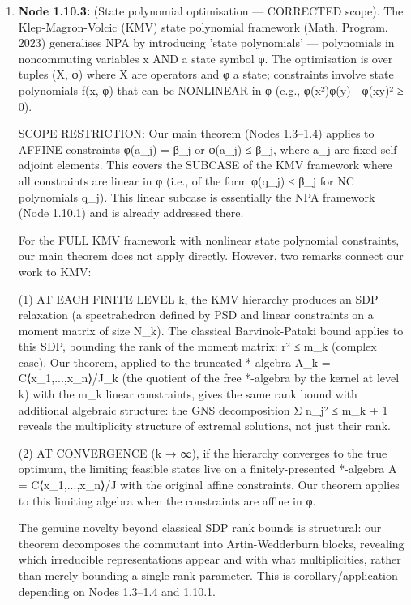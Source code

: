 \documentclass{article}
\begin{document}
\begin{enumerate}
\begin{enumerate}
This node is a corollary of the main theorem (Nodes 1.3-1.4) applied to the NPA setting (Node 1.10.1), not an assumption. It depends on Nodes 1, 1.3, 1.4, 1.6, and 1.10.1.

  Type: claim, Inference: assumption, Status: pending, Taint: unresolved

\item \textbf{Node 1.10.3:} (State polynomial optimisation — CORRECTED scope). The Klep-Magron-Volcic (KMV) state polynomial framework (Math. Program. 2023) generalises NPA by introducing 'state polynomials' — polynomials in noncommuting variables x AND a state symbol φ. The optimisation is over tuples (X, φ) where X are operators and φ a state; constraints involve state polynomials f(x, φ) that can be NONLINEAR in φ (e.g., φ(x²)φ(y) - φ(xy)² ≥ 0).

SCOPE RESTRICTION: Our main theorem (Nodes 1.3–1.4) applies to AFFINE constraints φ(a\_j) = β\_j or φ(a\_j) ≤ β\_j, where a\_j are fixed self-adjoint elements. This covers the SUBCASE of the KMV framework where all constraints are linear in φ (i.e., of the form φ(q\_j) ≤ β\_j for NC polynomials q\_j). This linear subcase is essentially the NPA framework (Node 1.10.1) and is already addressed there.

For the FULL KMV framework with nonlinear state polynomial constraints, our main theorem does not apply directly. However, two remarks connect our work to KMV:

(1) AT EACH FINITE LEVEL k, the KMV hierarchy produces an SDP relaxation (a spectrahedron defined by PSD and linear constraints on a moment matrix of size N\_k). The classical Barvinok-Pataki bound applies to this SDP, bounding the rank of the moment matrix: r² ≤ m\_k (complex case). Our theorem, applied to the truncated *-algebra A\_k = C⟨x\_1,...,x\_n⟩/J\_k (the quotient of the free *-algebra by the kernel at level k) with the m\_k linear constraints, gives the same rank bound with additional algebraic structure: the GNS decomposition Σ n\_j² ≤ m\_k + 1 reveals the multiplicity structure of extremal solutions, not just their rank.

(2) AT CONVERGENCE (k → ∞), if the hierarchy converges to the true optimum, the limiting feasible states live on a finitely-presented *-algebra A = C⟨x\_1,...,x\_n⟩/J with the original affine constraints. Our theorem applies to this limiting algebra when the constraints are affine in φ.

The genuine novelty beyond classical SDP rank bounds is structural: our theorem decomposes the commutant into Artin-Wedderburn blocks, revealing which irreducible representations appear and with what multiplicities, rather than merely bounding a single rank parameter. This is corollary/application depending on Nodes 1.3–1.4 and 1.10.1.


\end{enumerate}
\end{enumerate}
\end{document}
